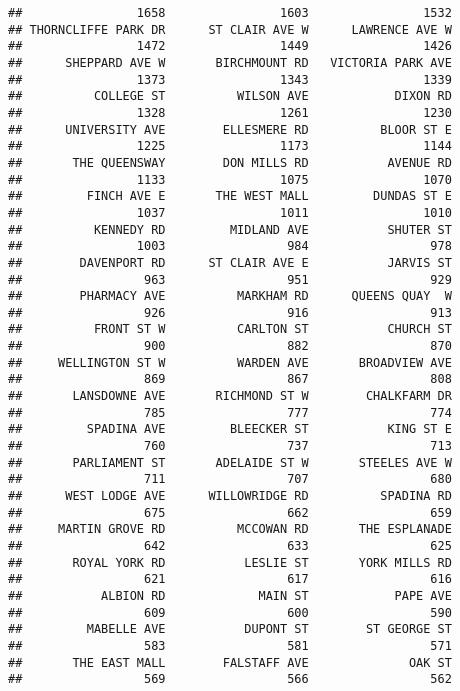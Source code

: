 \documentclass[]{article}
\begin{document}
\begin{verbatim}
##                1658                1603                1532 
## THORNCLIFFE PARK DR      ST CLAIR AVE W      LAWRENCE AVE W 
##                1472                1449                1426 
##      SHEPPARD AVE W       BIRCHMOUNT RD   VICTORIA PARK AVE 
##                1373                1343                1339 
##          COLLEGE ST          WILSON AVE            DIXON RD 
##                1328                1261                1230 
##      UNIVERSITY AVE        ELLESMERE RD          BLOOR ST E 
##                1225                1173                1144 
##       THE QUEENSWAY        DON MILLS RD           AVENUE RD 
##                1133                1075                1070 
##         FINCH AVE E       THE WEST MALL         DUNDAS ST E 
##                1037                1011                1010 
##          KENNEDY RD         MIDLAND AVE           SHUTER ST 
##                1003                 984                 978 
##        DAVENPORT RD      ST CLAIR AVE E           JARVIS ST 
##                 963                 951                 929 
##        PHARMACY AVE          MARKHAM RD      QUEENS QUAY  W 
##                 926                 916                 913 
##          FRONT ST W          CARLTON ST           CHURCH ST 
##                 900                 882                 870 
##     WELLINGTON ST W          WARDEN AVE       BROADVIEW AVE 
##                 869                 867                 808 
##       LANSDOWNE AVE       RICHMOND ST W        CHALKFARM DR 
##                 785                 777                 774 
##         SPADINA AVE         BLEECKER ST           KING ST E 
##                 760                 737                 713 
##       PARLIAMENT ST       ADELAIDE ST W       STEELES AVE W 
##                 711                 707                 680 
##      WEST LODGE AVE      WILLOWRIDGE RD          SPADINA RD 
##                 675                 662                 659 
##     MARTIN GROVE RD          MCCOWAN RD       THE ESPLANADE 
##                 642                 633                 625 
##       ROYAL YORK RD           LESLIE ST       YORK MILLS RD 
##                 621                 617                 616 
##           ALBION RD             MAIN ST            PAPE AVE 
##                 609                 600                 590 
##         MABELLE AVE           DUPONT ST        ST GEORGE ST 
##                 583                 581                 571 
##       THE EAST MALL        FALSTAFF AVE              OAK ST 
##                 569                 566                 562 

\end{verbatim}
\end{document}
